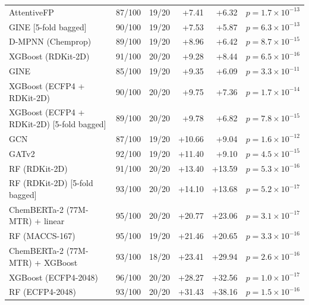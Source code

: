 \documentclass[11pt]{article}
\begin{document}
{\begin{longtable}{lccrrc}
AttentiveFP & 87/100 & 19/20 & +7.41 & +6.32 & $p = 1.7 \times 10^{-13}$ \\
GINE [5-fold bagged] & 90/100 & 19/20 & +7.53 & +5.87 & $p = 6.3 \times 10^{-13}$ \\
D-MPNN (Chemprop) & 89/100 & 19/20 & +8.96 & +6.42 & $p = 8.7 \times 10^{-15}$ \\
XGBoost (RDKit-2D) & 91/100 & 20/20 & +9.28 & +8.44 & $p = 6.5 \times 10^{-16}$ \\
GINE & 85/100 & 19/20 & +9.35 & +6.09 & $p = 3.3 \times 10^{-11}$ \\
XGBoost (ECFP4 + RDKit-2D) & 90/100 & 20/20 & +9.75 & +7.36 & $p = 1.7 \times 10^{-14}$ \\
XGBoost (ECFP4 + RDKit-2D) [5-fold bagged] & 89/100 & 20/20 & +9.78 & +6.82 & $p = 7.8 \times 10^{-15}$ \\
GCN & 87/100 & 19/20 & +10.66 & +9.04 & $p = 1.6 \times 10^{-12}$ \\
GATv2 & 92/100 & 19/20 & +11.40 & +9.10 & $p = 4.5 \times 10^{-15}$ \\
RF (RDKit-2D) & 91/100 & 20/20 & +13.40 & +13.59 & $p = 5.3 \times 10^{-16}$ \\
RF (RDKit-2D) [5-fold bagged] & 93/100 & 20/20 & +14.10 & +13.68 & $p = 5.2 \times 10^{-17}$ \\
ChemBERTa-2 (77M-MTR) + linear & 95/100 & 20/20 & +20.77 & +23.06 & $p = 3.1 \times 10^{-17}$ \\
RF (MACCS-167) & 95/100 & 19/20 & +21.46 & +20.65 & $p = 3.3 \times 10^{-16}$ \\
ChemBERTa-2 (77M-MTR) + XGBoost & 93/100 & 18/20 & +23.41 & +29.94 & $p = 2.6 \times 10^{-16}$ \\
XGBoost (ECFP4-2048) & 96/100 & 20/20 & +28.27 & +32.56 & $p = 1.0 \times 10^{-17}$ \\
RF (ECFP4-2048) & 93/100 & 20/20 & +31.43 & +38.16 & $p = 1.5 \times 10^{-16}$ \\
\bottomrule
\end{longtable}}
\end{document}
